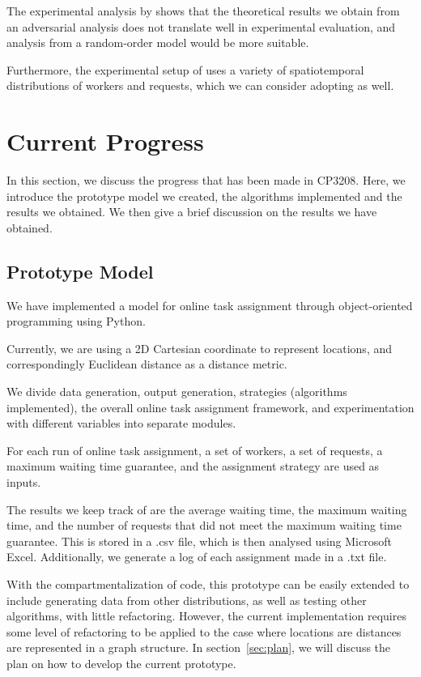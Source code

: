 \documentclass[urop]{nurop}
\begin{document}
The experimental analysis by \cite{tong} shows that the theoretical results we obtain from an adversarial analysis does not translate well in experimental evaluation, and analysis from a random-order model would be more suitable.

Furthermore, the experimental setup of \cite{tong} uses a variety of spatiotemporal distributions of workers and requests, which we can consider adopting as well.

\section{Current Progress}
In this section, we discuss the progress that has been made in CP3208. Here, we introduce the prototype model we created, the algorithms implemented and the results we obtained. We then give a brief discussion on the results we have obtained.

\subsection{Prototype Model}
We have implemented a model for online task assignment through object-oriented programming using Python. 

Currently, we are using a 2D Cartesian coordinate to represent locations, and correspondingly Euclidean distance as a distance metric.

We divide data generation, output generation, strategies (algorithms implemented), the overall online task assignment framework, and experimentation with different variables into separate modules.

For each run of online task assignment, a set of workers, a set of requests, a maximum waiting time guarantee, and the assignment strategy are used as inputs.

The results we keep track of are the average waiting time, the maximum waiting time, and the number of requests that did not meet the maximum waiting time guarantee. This is stored in a .csv file, which is then analysed using Microsoft Excel. Additionally, we generate a log of each assignment made in a .txt file.

With the compartmentalization of code, this prototype can be easily extended to include generating data from other distributions, as well as testing other algorithms, with little refactoring. However, the current implementation requires some level of refactoring to be applied to the case where locations are distances are represented in a graph structure. In section~\ref{sec:plan}, we will discuss the plan on how to develop the current prototype.
\end{document}

